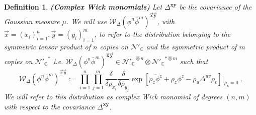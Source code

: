 \documentclass{elsarticle}%
\newtheorem{definition}{Definition}%
\begin{document}
\begin{definition}
    \label{def:ComplexWickMonomials}{\bf (Complex Wick monomials)} 
    Let  $\Delta^{\mathbf{xy}}$ be the covariance of the Gaussian measure $\mu$.  
    We will use $\mathcal{W}_\Delta(\phi^n\bar{\phi}^m)^{\vec{\mathbf{x}}\vec{\mathbf{y}}}$, with $\vec{x}=(x_i)_{i=1}^n, \vec{y}=(y_i)_{i=1}^m$, to refer to the distribution belonging to the symmetric tensor product of $n$ copies on $\mathcal{N}'_\mathbb{C}$ and the symmetric product of $m$ copies on ${\mathcal{N}'_\mathbb{C}}^*$ i.e. $\mathcal{W}_\Delta(\phi^n\bar{\phi}^m)^{\vec{\mathbf{x}}\vec{\mathbf{y}}}\in{\mathcal{N}'_\mathbb{C}}^{\hat{\otimes}n}\otimes {\mathcal{N}'_\mathbb{C}}^{*\hat{\otimes}m}$ such that
    \begin{equation}
    \label{eq:ComplexWienerIto}
    \mathcal{W}_\Delta(\phi^n\bar{\phi}^m)^{\vec{x}\vec{y}}:=\prod_{i=1}^n\prod_{j=1}^m\frac{\delta}{\delta \rho_{x_i}}\frac{\delta}{\delta \bar\rho_{y_j}}\exp\left[{\overline{\rho_z\phi^z}+\rho_z\phi^z-\bar\rho_u\Delta^{uv}\rho_v}\right]\bigg\lvert_{\rho_{\mathbf{x}}=0}\;.
    \end{equation}
    We will refer to this distribution as \textit{complex Wick monomial} of degrees $(n,m)$ with respect to the covariance $\Delta^{\mathbf{xy}}$.
\end{definition}
\end{document}
